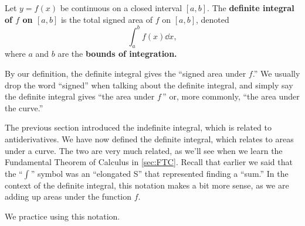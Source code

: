 \begin{definition}\label{def:def_int}%
Let $y=f(x)$ be continuous on a closed interval $[a,b]$. The \textbf{definite integral of $f$ on $[a,b]$} is the total signed area of $f$ on $[a,b]$, denoted
\[\int_a^b f(x)\dd x,\]
where $a$ and $b$ are the \textbf{bounds of integration.}%
%
\end{definition}

By our definition, the definite integral gives the ``signed area under $f$.'' We usually drop the word ``signed'' when talking about the definite integral, and simply say the definite integral gives ``the area under $f$\,'' or, more commonly, ``the area under the curve.''

The previous section introduced the indefinite integral, which is related to antiderivatives. We have now defined the definite integral, which relates to areas under a curve. The two are very much related, as we'll see when we learn the Fundamental Theorem of Calculus in \autoref{sec:FTC}. Recall that earlier we said that the ``$\int$'' symbol was an ``elongated S'' that represented finding a ``sum.'' In the context of the definite integral, this notation makes a bit more sense, as we are adding up areas under the function $f$.

We practice using this notation.

